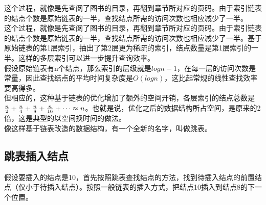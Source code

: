 这个过程，就像是先查阅了图书的目录，再翻到章节所对应的页码。由于索引链表的结点个数是原始链表的一半，查找结点所需的访问次数也相应减少了一半。\\

这个过程，就像是先查阅了图书的目录，再翻到章节所对应的页码。由于索引链表的结点个数是原始链表的一半，查找结点所需的访问次数也相应减少了一半。基于原始链表的第1层索引，抽出了第2层更为稀疏的索引，结点数量是第1层索引的一半。这样的多层索引可以进一步提升查询效率。\\

假设原始链表有n个结点，那么索引的层级就是$ logn - 1 $，在每一层的访问次数是常量，因此查找结点的平均时间复杂度是$ O(logn) $，这比起常规的线性查找效率要高得多。\\

但相应的，这种基于链表的优化增加了额外的空间开销，各层索引的结点总数是$ {n \over 2} + {n \over 4} + {n \over 8} + {n \over 16} + \dots \approx n $。也就是说，优化之后的数据结构所占空间，是原来的2倍，这是典型的以空间换时间的做法。\\

像这样基于链表改造的数据结构，有一个全新的名字，叫做跳表。\\

\subsection{跳表插入结点}

假设要插入的结点是10，首先按照跳表查找结点的方法，找到待插入结点的前置结点（仅小于待插入结点）。按照一般链表的插入方式，把结点10插入到结点8的下一个位置。\\

